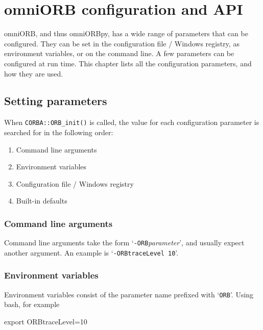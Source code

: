 \documentclass[11pt,oneside,a4paper]{book}
\newcommand{\op}[1]{\texttt{#1()}}
\newcommand{\cmdline}[1]{\texttt{#1}}
\begin{document}
\chapter{omniORB configuration and API}
\label{chap:config}

omniORB, and thus omniORBpy, has a wide range of parameters that can
be configured. They can be set in the configuration file / Windows
registry, as environment variables, or on the command line. A few
parameters can be configured at run time. This chapter lists all the
configuration parameters, and how they are used.

\section{Setting parameters}

When \op{CORBA::ORB\_init} is called, the value for each configuration
parameter is searched for in the following order:

\begin{enumerate}

\item Command line arguments
\item Environment variables
\item Configuration file / Windows registry
\item Built-in defaults

\end{enumerate}

\subsection{Command line arguments}
\label{sec:ORBargs}

Command line arguments take the form
`\cmdline{-ORB}\textit{parameter}', and usually expect another
argument. An example is `\cmdline{-ORBtraceLevel 10}'.


\subsection{Environment variables}

Environment variables consist of the parameter name prefixed with
`\cmdline{ORB}'. Using bash, for example

\begin{makelisting}
export ORBtraceLevel=10
\end{makelisting}
\end{document}
